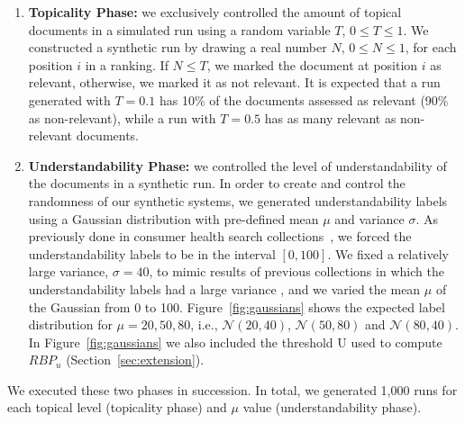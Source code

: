 
\begin{enumerate}
\item \textbf{Topicality Phase:} we exclusively controlled the amount of topical documents in a simulated run using a random variable $T$, $0 \le T \le 1$. 
We constructed a synthetic run by drawing a real number $N$, $0 \le N \le 1$, for each position $i$ in a ranking. If $N \le T$, we marked the document at position $i$ as relevant, otherwise, we marked it as not relevant. It is expected that a run generated with $T=0.1$ has 10\% of the documents assessed as relevant (90\% as non-relevant), while a run with $T=0.5$ has as many relevant as non-relevant documents. 

\item \textbf{Understandability Phase:}  we controlled the level of understandability of the documents in a synthetic run. In order to create and control the randomness of our synthetic systems, we generated understandability labels using a Gaussian distribution with pre-defined mean $\mu$ and variance $\sigma$. 
As previously done in consumer health search collections~\cite{clefIR16,clefIR17}, we forced the understandability labels to be in the interval $[0,100]$. 
We fixed a relatively large variance, $\sigma=40$, to mimic results of previous collections in which the understandability labels had a large variance \cite{clefIR16}, and we varied the mean $\mu$ of the Gaussian from 0 to 100. Figure~\ref{fig:gaussians} shows the expected label distribution for $\mu=20, 50, 80$, i.e., $\mathcal{N}(20, 40)$, $\mathcal{N}(50, 80)$ and $\mathcal{N}(80, 40)$.
In Figure~\ref{fig:gaussians} we also included the threshold U used to compute $RBP_u$ (Section~\ref{sec:extension}).
\end{enumerate}

We executed these two phases in succession. In total, we generated 1,000 runs for each topical level (topicality phase) and $\mu$ value (understandability phase). 


